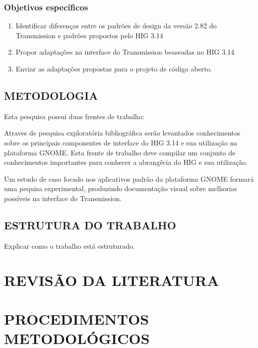 \documentclass[
	12pt,				%
	openright,			%
	oneside,			%
	a4paper,			%
	chapter=TITLE,		%
	section=TITLE,		%
	brazil				%
	]{abntex2}
\begin{document}
\subsection{Objetivos específicos}

\begin{enumerate}
  \item Identificar diferenças entre os padrões de design da versão 2.82 do
  Transmission e padrões propostos pelo HIG 3.14
  \item Propor adaptações na interface do Transmission beaseadas no HIG 3.14
  \item Enviar as adaptações propostas para o projeto de código aberto. 
\end{enumerate}

\section{METODOLOGIA}

Esta pesquisa possui duas frentes de trabalho:

Atraves de pesquisa exploratória bibliográfica serão levantados conhecimentos
sobre os principais componentes de interface do HIG 3.14 e sua utilização na
plataforma GNOME. Esta frente de trabalho deve compilar um conjunto de 
conhecimentos importantes para conhecer a abrangêcia do HIG e sua utilização. 

Um estudo de caso focado nos aplicativos padrão da plataforma GNOME formará uma
pequisa experimental, produzindo documentação visual sobre melhorias possíveis
na interface do Transmission.

\section{ESTRUTURA DO TRABALHO}

Explicar como o trabalho está estruturado.

\chapter{REVISÃO DA LITERATURA}\label{cap-revisao}



\chapter{PROCEDIMENTOS METODOLÓGICOS}
\end{document}
